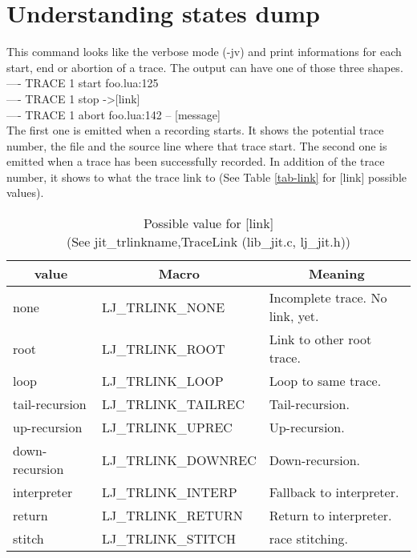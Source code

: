 \section{Understanding states dump}
\label{Sec:dump-states}
This command looks like the verbose mode (-jv) and print informations for each start,
end or abortion of a trace. The output can have one of those three shapes.\\
---- TRACE 1 start foo.lua:125\\
---- TRACE 1 stop -\textgreater [link]\\
---- TRACE 1 abort foo.lua:142 -- [message]\\
The first one is emitted when a recording starts. It shows the potential
trace number, the file and the source line where that trace start.
The second one is emitted when a trace has been successfully recorded. In
addition of the trace number, it shows to what the trace link to (See Table
\ref{tab-link} for [link] possible values).

\begin{table}
\centering
\begin{tabular}{|l|l|l|}
\hline
\multicolumn{1}{|c|}{value} & \multicolumn{1}{c|}{Macro} & \multicolumn{1}{c|}{Meaning}\\\hline
none           & LJ\_TRLINK\_NONE    & Incomplete trace. No link, yet.\\
root           & LJ\_TRLINK\_ROOT    & Link to other root trace.\\
loop           & LJ\_TRLINK\_LOOP    & Loop to same trace.\\
tail-recursion & LJ\_TRLINK\_TAILREC & Tail-recursion.\\
up-recursion   & LJ\_TRLINK\_UPREC   & Up-recursion.\\
down-recursion & LJ\_TRLINK\_DOWNREC & Down-recursion.\\
interpreter    & LJ\_TRLINK\_INTERP  & Fallback to interpreter.\\
return         & LJ\_TRLINK\_RETURN  & Return to interpreter.\\
stitch         & LJ\_TRLINK\_STITCH  & race stitching.\\\hline
\end{tabular}
\caption{Possible value for [link] \\(See jit\_trlinkname,TraceLink (lib\_jit.c, lj\_jit.h))}
\label{tab:dump-link}
\end{table}











